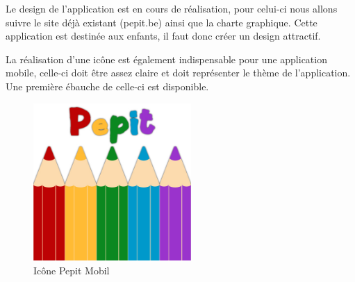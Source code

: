 Le design de l'application est en cours de réalisation, pour celui-ci nous allons suivre le site déjà existant (pepit.be) ainsi que la charte graphique. Cette application est destinée aux enfants, il faut donc créer un design attractif.


La réalisation d'une icône est également indispensable pour une application mobile, celle-ci doit \^{e}tre assez claire et doit représenter le thème de l'application. Une première ébauche de celle-ci est disponible.


\begin{figure}[H]
\begin{center}
\includegraphics[width=6cm]{images/icone_2}
\end{center}
\caption{Icône Pepit Mobil}
\label{Icone Pepit Mobil}
\end{figure}